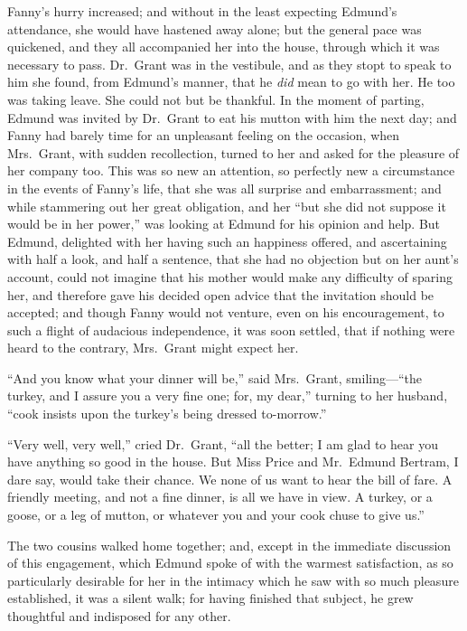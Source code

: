 \documentclass{article}
\begin{document}
Fanny's hurry increased; and without in the least expecting
Edmund's attendance, she would have hastened away alone;
but the general pace was quickened, and they all accompanied
her into the house, through which it was necessary to pass.
Dr.\ Grant was in the vestibule, and as they stopt to
speak to him she found, from Edmund's manner, that he
\emph{did} mean to go with her.  He too was taking leave.
She could not but be thankful.  In the moment of parting,
Edmund was invited by Dr.\ Grant to eat his mutton
with him the next day; and Fanny had barely time for an
unpleasant feeling on the occasion, when Mrs.\ Grant,
with sudden recollection, turned to her and asked for the
pleasure of her company too.  This was so new an attention,
so perfectly new a circumstance in the events of
Fanny's life, that she was all surprise and embarrassment;
and while stammering out her great obligation, and her
``but she did not suppose it would be in her power,''
was looking at Edmund for his opinion and help.  But Edmund,
delighted with her having such an happiness offered,
and ascertaining with half a look, and half a sentence,
that she had no objection but on her aunt's account,
could not imagine that his mother would make any difficulty
of sparing her, and therefore gave his decided open advice
that the invitation should be accepted; and though Fanny
would not venture, even on his encouragement, to such
a flight of audacious independence, it was soon settled,
that if nothing were heard to the contrary, Mrs.\ Grant
might expect her.

``And you know what your dinner will be,''
said Mrs.\ Grant, smiling---``the turkey, and I assure you
a very fine one; for, my dear,'' turning to her husband,
``cook insists upon the turkey's being dressed to-morrow.''

``Very well, very well,'' cried Dr.\ Grant, ``all the better;
I am glad to hear you have anything so good in the house.
But Miss Price and Mr.\ Edmund Bertram, I dare say, would take
their chance.  We none of us want to hear the bill of fare.
A friendly meeting, and not a fine dinner, is all we
have in view.  A turkey, or a goose, or a leg of mutton,
or whatever you and your cook chuse to give us.''

The two cousins walked home together; and, except in the
immediate discussion of this engagement, which Edmund
spoke of with the warmest satisfaction, as so particularly
desirable for her in the intimacy which he saw with
so much pleasure established, it was a silent walk;
for having finished that subject, he grew thoughtful
and indisposed for any other.
\end{document}
